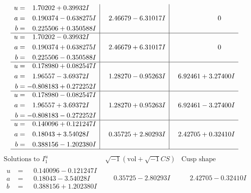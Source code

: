 \documentclass[1p]{elsarticle_modified}
\theoremstyle{definition}
\newcommand{\I}{\sqrt{-1}}
\begin{document}
$$\begin{array}{c|c|c}
\begin{aligned}
u &= \phantom{-}1.70202 + 0.39932 I \\
a &= \phantom{-}0.190374 - 0.638275 I \\
b &= \phantom{-}0.225506 + 0.350588 I\end{aligned}
 & \phantom{-}2.46679 - 6.31017 I & \phantom{-0.000000 } 0 \\ \hline\begin{aligned}
u &= \phantom{-}1.70202 - 0.39932 I \\
a &= \phantom{-}0.190374 + 0.638275 I \\
b &= \phantom{-}0.225506 - 0.350588 I\end{aligned}
 & \phantom{-}2.46679 + 6.31017 I & \phantom{-0.000000 } 0 \\ \hline\begin{aligned}
u &= \phantom{-}0.178980 + 0.082547 I \\
a &= \phantom{-}1.96557 - 3.69372 I \\
b &= -0.808183 + 0.272252 I\end{aligned}
 & \phantom{-}1.28270 - 0.95263 I & \phantom{-}6.92461 + 3.27400 I \\ \hline\begin{aligned}
u &= \phantom{-}0.178980 - 0.082547 I \\
a &= \phantom{-}1.96557 + 3.69372 I \\
b &= -0.808183 - 0.272252 I\end{aligned}
 & \phantom{-}1.28270 + 0.95263 I & \phantom{-}6.92461 - 3.27400 I \\ \hline\begin{aligned}
u &= \phantom{-}0.140096 + 0.121247 I \\
a &= \phantom{-}0.18043 + 3.54028 I \\
b &= \phantom{-}0.388156 - 1.202380 I\end{aligned}
 & \phantom{-}0.35725 + 2.80293 I & \phantom{-}2.42705 + 0.32410 I\\
 \hline 
 \end{array}$$\newpage$$\begin{array}{c|c|c}  
\text{Solutions to }I^u_{1}& \I (\text{vol} + \sqrt{-1}CS) & \text{Cusp shape}\\
 \hline 
\begin{aligned}
u &= \phantom{-}0.140096 - 0.121247 I \\
a &= \phantom{-}0.18043 - 3.54028 I \\
b &= \phantom{-}0.388156 + 1.202380 I\end{aligned}
 & \phantom{-}0.35725 - 2.80293 I & \phantom{-}2.42705 - 0.32410 I \\ \hline\begin{aligned}

\end{aligned}
\end{array}$$
\end{document}
